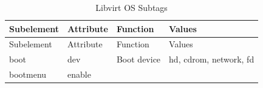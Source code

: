 \documentclass[
  14pt,
  english,
  a4paper,
]{scrreprt}
\begin{document}
\hypertarget{tbl:lvirt_os_subtags}{}
\begin{longtable}[]{@{}llll@{}}
\caption{\label{tbl:lvirt_os_subtags}Libvirt OS Subtags}\tabularnewline
\toprule
\begin{minipage}[b]{0.16\columnwidth}\raggedright
Subelement\strut
\end{minipage} & \begin{minipage}[b]{0.15\columnwidth}\raggedright
Attribute\strut
\end{minipage} & \begin{minipage}[b]{0.23\columnwidth}\raggedright
Function\strut
\end{minipage} & \begin{minipage}[b]{0.31\columnwidth}\raggedright
Values\strut
\end{minipage}\tabularnewline
\midrule
\endfirsthead
\toprule
\begin{minipage}[b]{0.16\columnwidth}\raggedright
Subelement\strut
\end{minipage} & \begin{minipage}[b]{0.15\columnwidth}\raggedright
Attribute\strut
\end{minipage} & \begin{minipage}[b]{0.23\columnwidth}\raggedright
Function\strut
\end{minipage} & \begin{minipage}[b]{0.31\columnwidth}\raggedright
Values\strut
\end{minipage}\tabularnewline
\midrule
\endhead
\begin{minipage}[t]{0.16\columnwidth}\raggedright
boot\strut
\end{minipage} & \begin{minipage}[t]{0.15\columnwidth}\raggedright
dev\strut
\end{minipage} & \begin{minipage}[t]{0.23\columnwidth}\raggedright
Boot device\strut
\end{minipage} & \begin{minipage}[t]{0.31\columnwidth}\raggedright
hd, cdrom, network, fd\strut
\end{minipage}\tabularnewline
\begin{minipage}[t]{0.16\columnwidth}\raggedright
bootmenu\strut
\end{minipage} & \begin{minipage}[t]{0.15\columnwidth}\raggedright
enable\strut
\end{minipage} & \begin{minipage}[t]{0.23\columnwidth}\raggedright

\end{minipage}
\end{longtable}
\end{document}
